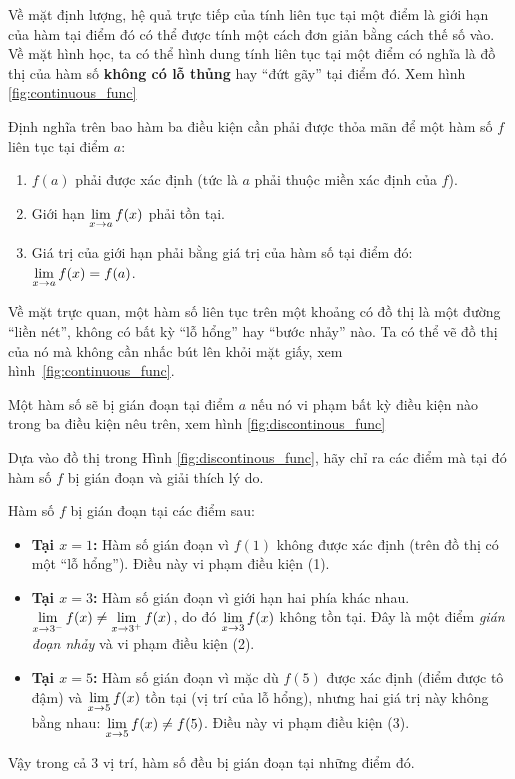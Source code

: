 Về mặt định lượng, hệ quả trực tiếp của tính liên tục tại một điểm là giới hạn của hàm tại điểm đó có thể được tính một cách đơn giản bằng cách thế số vào. Về mặt hình học, ta có thể hình dung tính liên tục tại một điểm có nghĩa là đồ thị của hàm số \textbf{không có lỗ thủng} hay ``đứt gãy'' tại điểm đó. Xem hình \ref{fig:continuous_func}

Định nghĩa trên bao hàm ba điều kiện cần phải được thỏa mãn để một hàm số $f$ liên tục tại điểm $a$:
\begin{enumerate}
    \item $f(a)$ phải được xác định (tức là $a$ phải thuộc miền xác định của $f$).
    \item Giới hạn $\lim\limits_{x \to a} f(x)$ phải tồn tại.
    \item Giá trị của giới hạn phải bằng giá trị của hàm số tại điểm đó: $\lim\limits_{x \to a} f(x) = f(a)$.
\end{enumerate}

Về mặt trực quan, một hàm số liên tục trên một khoảng có đồ thị là một đường ``liền nét'', không có bất kỳ ``lỗ hổng'' hay ``bước nhảy'' nào. Ta có thể vẽ đồ thị của nó mà không cần nhấc bút lên khỏi mặt giấy, xem hình~\ref{fig:continuous_func}.



Một hàm số sẽ bị gián đoạn tại điểm $a$ nếu nó vi phạm bất kỳ điều kiện nào trong ba điều kiện nêu trên, xem hình \ref{fig:discontinous_func}



\begin{example}
    Dựa vào đồ thị trong Hình \ref{fig:discontinous_func}, hãy chỉ ra các điểm mà tại đó hàm số $f$ bị gián đoạn và giải thích lý do.
\end{example}
\begin{solution}
    Hàm số $f$ bị gián đoạn tại các điểm sau:
    \begin{itemize}
        \item \textbf{Tại $x=1$:} Hàm số gián đoạn vì $f(1)$ không được xác định (trên đồ thị có một ``lỗ hổng''). Điều này vi phạm điều kiện (1).
        \item \textbf{Tại $x=3$:} Hàm số gián đoạn vì giới hạn hai phía khác nhau. $\lim\limits_{x \to 3^{-}} f(x) \neq \lim\limits_{x \to 3^{+}} f(x)$, do đó $\lim\limits_{x \to 3} f(x)$ không tồn tại. Đây là một điểm \textit{gián đoạn nhảy} và vi phạm điều kiện (2).
        \item \textbf{Tại $x=5$:} Hàm số gián đoạn vì mặc dù $f(5)$ được xác định (điểm được tô đậm) và $\lim\limits_{x \to 5} f(x)$ tồn tại (vị trí của lỗ hổng), nhưng hai giá trị này không bằng nhau: $\lim\limits_{x \to 5} f(x) \neq f(5)$. Điều này vi phạm điều kiện (3).
    \end{itemize}
    Vậy trong cả $3$ vị trí, hàm số đều bị gián đoạn tại những điểm đó.
\end{solution}

